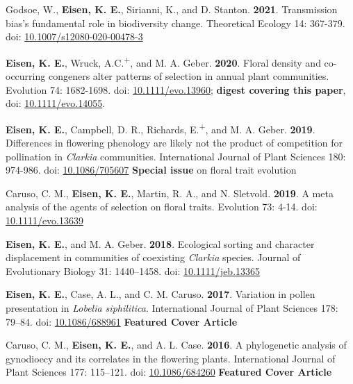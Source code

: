 \documentclass[letterpaper,11pt]{article}
\begin{document}
\begin{etaremune}
\item Godsoe, W., \textbf{Eisen, K. E.}, Sirianni, K., and D. Stanton. \textbf{2021}. Transmission bias's fundamental role in biodiversity change. Theoretical Ecology 14: 367-379. doi:  \href{https://doi.org/10.1007/s12080-020-00478-3} {10.1007/s12080-020-00478-3} \\
\item \textbf{Eisen, K. E.}, Wruck, A.C.\textsuperscript{+}, and M. A. Geber. \textbf{2020}. Floral density and co-occurring congeners alter patterns of selection in annual plant communities. Evolution 74: 1682-1698. doi:  \href{https://doi.org/10.1111/evo.13960} {10.1111/evo.13960}; \textbf{digest covering this paper}, doi: \href{https://doi.org/10.1111/evo.14055} {10.1111/evo.14055}. \\
\item \textbf{Eisen, K. E.}, Campbell, D. R., Richards, E.\textsuperscript{+}, and M. A. Geber. \textbf{2019}. Differences in flowering phenology are likely not the product of competition for pollination in \textit{Clarkia} communities. International Journal of Plant Sciences 180: 974-986. doi:  \href{https://doi.org/10.1086/705607} {10.1086/705607} \textbf{Special issue} on floral trait evolution\\
\item Caruso, C. M., \textbf{Eisen, K. E.}, Martin, R. A., and N. Sletvold. \textbf{2019}. A meta analysis of the agents of selection on floral traits. Evolution 73: 4-14. doi:  \href{https://doi.org/10.1111/evo.13639} {10.1111/evo.13639}\\



\item \textbf{Eisen, K. E.}, and M. A. Geber. \textbf{2018}. Ecological sorting and character displacement in communities of coexisting \textit{Clarkia} species. Journal of Evolutionary Biology 31: 1440–1458. doi:  \href{https://doi.org/10.1111/jeb.13365} {10.1111/jeb.13365}\\


\item \textbf{Eisen, K. E.}, Case, A. L., and C. M. Caruso. \textbf{2017}. Variation in pollen presentation in \textit{Lobelia siphilitica}. International Journal of Plant Sciences 178: 79–84. doi:  \href{https://doi.org/10.1086/688961} {10.1086/688961}  \textbf{Featured Cover Article}\\

\item Caruso, C. M., \textbf{Eisen, K. E.}, and A. L. Case. \textbf{2016}. A phylogenetic analysis of gynodioecy and its correlates in the flowering plants. International Journal of Plant Sciences 177: 115–121. doi:  \href{https://doi.org/10.1086/684260} {10.1086/684260} \textbf{Featured Cover Article}\\


\end{etaremune}
\end{document}
